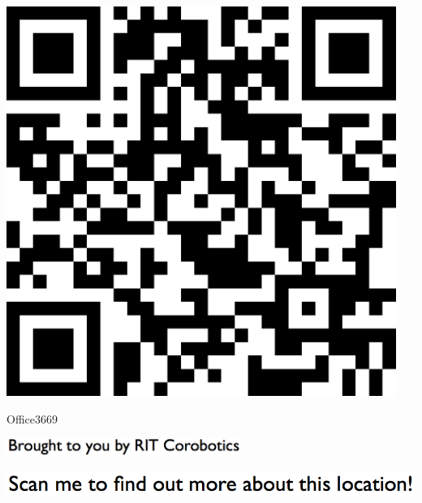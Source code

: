 \documentclass[letterpaper]{article}
\begin{document}
 \begingroup 
 \centerline{\includegraphics[scale=1,width=5in,height=5in]{Office3669.png}} 
 \endgroup 
 \vspace*{\fill} 

 \hfill{\small Office3669} 

  \vspace{0.7in} 
 
 \centerline{\includegraphics[scale=1,width=3in]{text-bottom.png}} 
 
 \pagebreak 
{} 
 \vspace*{\fill} 
 
  \centerline{\includegraphics[scale=1,width=6in]{text-top.png}} 
 
 \vspace{0.5in} 
 
\end{document}
